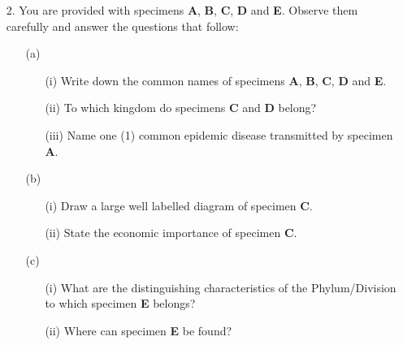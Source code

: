 \begin{enumerate}
\item[2.] You are provided with specimens \textbf{A}, \textbf{B}, \textbf{C}, \textbf{D} and \textbf{E}. Observe them carefully and answer the questions that follow:
\begin{enumerate}
\item[(a)]
\begin{enumerate}
\item[(i)] Write down the common names of specimens \textbf{A}, \textbf{B}, \textbf{C}, \textbf{D} and \textbf{E}.
\item[(ii)] To which kingdom do specimens \textbf{C} and \textbf{D} belong?
\item[(iii)] Name one (1) common epidemic disease transmitted by specimen \textbf{A}.
\end{enumerate}
\item[(b)]
\begin{enumerate}
\item[(i)] Draw a large well labelled diagram of specimen \textbf{C}.
\item[(ii)] State the economic importance of specimen \textbf{C}.
\end{enumerate}
\item[(c)]
\begin{enumerate}
\item[(i)] What are the distinguishing characteristics of the Phylum/Division to which specimen \textbf{E} belongs?
\item[(ii)] Where can specimen \textbf{E} be found?
\end{enumerate}

\end{enumerate}
\end{enumerate}